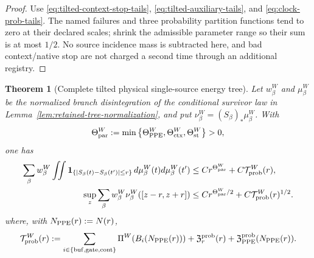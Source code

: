\documentclass[11pt]{article}
\newtheorem{theorem}{Theorem}[section]
\begin{document}
\begin{proof}
Use \eqref{eq:tilted-context-stop-tails},
\eqref{eq:tilted-auxiliary-tails}, and
\eqref{eq:clock-prob-tails}.  The named failures and three probability
partition functions tend to zero at their declared scales; shrink the
admissible parameter range so their sum is at most $1/2$.  No source
incidence mass is subtracted here, and bad context/native stop are not
charged a second time through an additional registry.
\end{proof}

\begin{theorem}[Complete tilted physical single-source energy tree]
\label{thm:direct-slope-small-ball}
Let $w_\beta^{W}$ and $\mu_\beta^{W}$ be the normalized branch
disintegration of the conditional survivor law in
Lemma~\ref{lem:retained-tree-normalization}, and put
$\nu_\beta^{W}=(S_\beta)_*\mu_\beta^{W}$.  With
\begin{equation}
\label{eq:physical-energy-exponent}
 \Theta_{\rm par}^{W}:=\min\left\{\Theta_{\rm PPE}^{W},
        \Theta_{\rm ctx}^{W},\Theta_{\rm st}^{W}\right\}>0,
\end{equation}
one has
\begin{align}
 \sum_\beta w_\beta^{W}\iint
   \mathbf 1_{\{|S_\beta(t)-S_\beta(t')|\le r\}}
   \,d\mu_\beta^{W}(t)d\mu_\beta^{W}(t')
 &\le Cr^{\Theta_{\rm par}^{W}}+C\mathcal T_{\rm prob}^{W}(r),\label{eq:conditional-energy-bound}\\
 \sup_z\sum_\beta w_\beta^{W}\nu_\beta^{W}([z-r,z+r])
 &\le Cr^{\Theta_{\rm par}^{W}/2}+C\mathcal T_{\rm prob}^{W}(r)^{1/2}.
 \label{eq:slope-value-small-ball}
\end{align}
where, with $N_{\rm PPE}(r):=N(r)$,
\begin{equation}
\label{eq:complete-energy-tail}
 \mathcal T_{\rm prob}^{W}(r):=
 \sum_{i\in\{\rm buf,gate,cont\}}\Pi^W(B_i(N_{\rm PPE}(r)))
 +\mathfrak Z_r^{\rm prob}(r)
 +\mathfrak Z_{\rm PPE}^{\rm prob}(N_{\rm PPE}(r)).
\end{equation}
\end{theorem}
\end{document}
